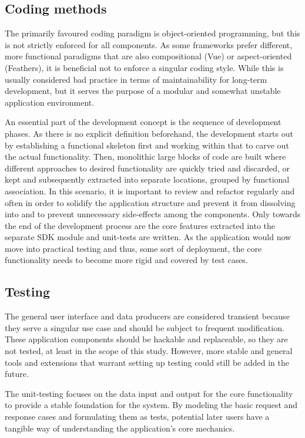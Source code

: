 \subsection{Coding methods}

The primarily favoured coding paradigm is object-oriented programming, but this is not strictly enforced for all components. As some frameworks prefer different, more functional paradigms that are also compositional (Vue) or aspect-oriented (Feathers), it is beneficial not to enforce a singular coding style. While this is usually considered bad practice in terms of maintainability for long-term development, but it serves the purpose of a modular and somewhat unstable  application environment.

An essential part of the development concept is the sequence of development phases. As there is no explicit definition beforehand, the development starts out by establishing a functional skeleton first and working within that to carve out the actual functionality. Then, monolithic large blocks of code are built where different approaches to desired functionality are quickly tried and discarded, or kept and subsequently extracted into separate locations, grouped by functional association. In this scenario, it is important to review and refactor regularly and often in order to solidify the application structure and prevent it from dissolving into  and to prevent unnecessary side-effects among the components. Only towards the end of the development process are the core features extracted into the separate \ac{SDK} module and unit-tests are written. As the application would now move into practical testing and thus, some sort of  deployment, the core functionality needs to become more rigid and covered by test cases.

\subsection{Testing}

The general user interface and data producers are considered transient because they serve a singular use case and should be subject to frequent modification. These application components should be hackable and replaceable, so they are not tested, at least in the scope of this study. However, more stable and general tools and extensions that warrant setting up testing could still be added in the future.

The unit-testing focuses on the data input and output for the core functionality to provide a stable foundation for the system. By modeling the basic request and response cases and formulating them as tests, potential later users have a tangible way of understanding the application's core mechanics.

